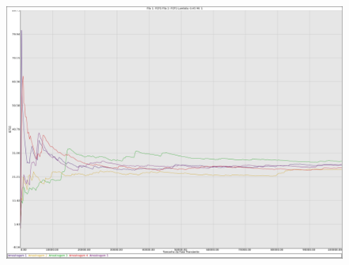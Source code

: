 \documentclass[a4paper,10pt]{article}
\begin{document}
\begin{figure}
\includegraphics[scale = 0.2]{./graficos_transiente_1/FCFS/06.png}
\end{figure}

\pagebreak
\end{document}
